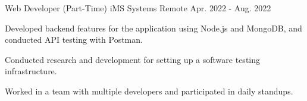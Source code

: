 \begin{cventries}
  \cventry
    {Web Developer (Part-Time)} %
    {iMS Systems} %
    {Remote} %
    {Apr. 2022 - Aug. 2022} %
    {
      \begin{cvitems} %
        \item Developed backend features for the application using Node.js and MongoDB, and conducted API testing with Postman.
        \item Conducted research and development for setting up a software testing infrastructure.
        \item Worked in a team with multiple developers and participated in daily standups.
      \end{cvitems}
    }

\end{cventries}
